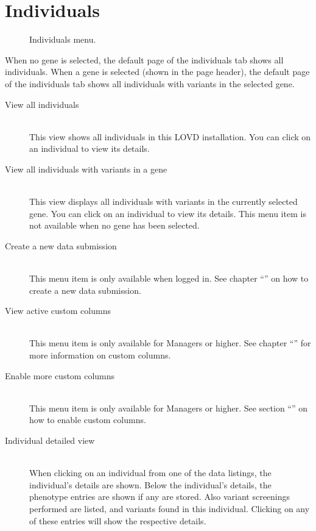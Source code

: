 \section{Individuals}
\begin{wrapfigure}[10]{r}{7cm}
  \vspace{-25pt}
  \begin{shaded}
    \centering
    \caption{Individuals menu.}
  \end{shaded}
\end{wrapfigure}
When no gene is selected, the default page of the individuals tab shows all individuals.
When a gene is selected (shown in the page header),
 the default page of the individuals tab shows all individuals with variants in the selected gene.

\begin{description}
  \item [View all individuals] \hfill \\
  This view shows all individuals in this LOVD installation.
  You can click on an individual to view its details.
  \item [View all individuals with variants in a gene] \hfill \\
  This view displays all individuals with variants in the currently selected gene.
  You can click on an individual to view its details.
  This menu item is not available when no gene has been selected.
\end{description}

\begin{description}
  \item [Create a new data submission] \hfill \\
  This menu item is only available when logged in.
  See chapter ``'' on how to create a new data submission.
  \item [View active custom columns] \hfill \\
  This menu item is only available for Managers or higher.
  See chapter ``'' for more information on custom columns.
  \item [Enable more custom columns] \hfill \\
  This menu item is only available for Managers or higher.
  See section ``'' on how to enable custom columns.
  \item [Individual detailed view] \hfill \\
  When clicking on an individual from one of the data listings, the individual's details are shown.
  Below the individual's details, the phenotype entries are shown if any are stored.
  Also variant screenings performed are listed, and variants found in this individual.
  Clicking on any of these entries will show the respective details.
\end{description}





